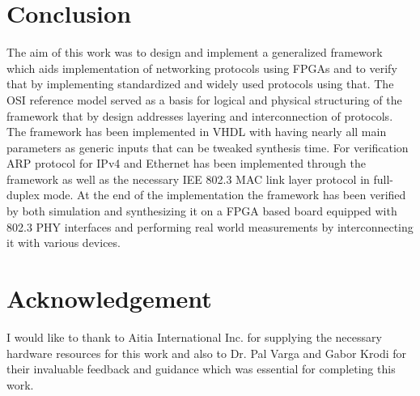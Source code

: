 \documentclass[conference]{IEEEtran}
\begin{document}
\section{Conclusion}

The aim of this work was to design and implement a generalized framework which aids implementation of networking protocols using FPGAs and to verify that by implementing standardized and widely used protocols using that. The OSI reference model served as a basis for logical and physical structuring of the framework that by design addresses layering and interconnection of protocols. The framework has been implemented in VHDL with having nearly all main parameters as generic inputs that can be tweaked synthesis time. For verification ARP protocol for IPv4 and Ethernet has been implemented through the framework as well as the necessary IEE 802.3 MAC link layer protocol in full-duplex mode.
At the end of the implementation the framework has been verified by both simulation and synthesizing it on a FPGA based board equipped with 802.3 PHY interfaces and performing real world measurements by interconnecting it with various devices. \cite{Williams_Web_Workload_Characterization_10_Years}

\section{Acknowledgement}
I would like to thank to Aitia International Inc. for supplying the necessary hardware resources for this work and also to Dr. Pal Varga and Gabor Krodi for their invaluable feedback and guidance which was essential for completing this work.





%

%
%
\end{document}
